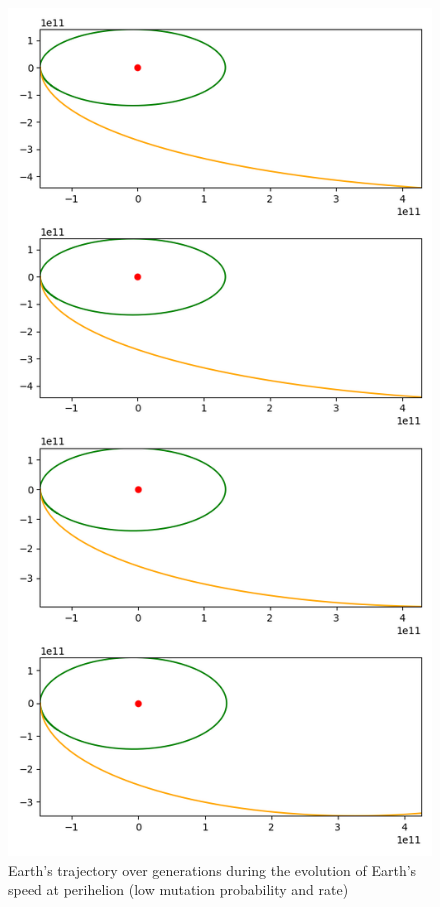 \begin{figure}
    \center
    \includegraphics[scale=.3]{img/perihelion_speed_test_0.01_0.01_100_50.png}
    \caption{Earth's trajectory over generations during the evolution of
        Earth's speed at perihelion (low mutation probability and rate)}
    \label{speed_low}
\end{figure}

